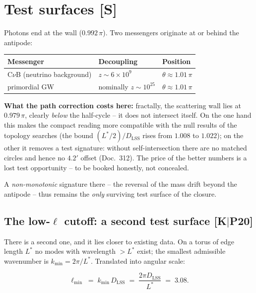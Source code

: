 \chapter{Test surfaces [S]}

Photons end at the wall ($0.992\,\pi$). Two messengers originate
at or behind the antipode:

\begin{center}
\begin{tabular}{lll}
\toprule
Messenger & Decoupling & Position \\
\midrule
C$\nu$B (neutrino background) & $z \sim 6\times10^{9}$ &
  $\theta \approx 1.01\,\pi$ \\
primordial GW & nominally $z \sim 10^{25}$ &
  $\theta \approx 1.01\,\pi$ \\
\bottomrule
\end{tabular}
\end{center}

\textbf{What the path correction costs here:} fractally, the
scattering wall lies at $0.979\,\pi$, clearly \emph{below} the
half-cycle -- it does not intersect itself. On the one hand this
makes the compact reading more compatible with the null results of
the topology searches (the bound $(L^{*}/2)/D_\text{LSS}$ rises
from $1.008$ to $1.022$); on the other it removes a test
signature: without self-intersection there are no matched circles
and hence no $4.2'$ offset (Doc.~312). The price of the better
numbers is a lost test opportunity -- to be booked honestly, not
concealed.

A \emph{non-monotonic} signature there -- the reversal of the mass
drift beyond the antipode -- thus remains the \emph{only}
surviving test surface of the closure.

\section{The low-$\ell$ cutoff: a second test surface [K$|$P20]}

There is a second one, and it lies closer to existing data. On a
torus of edge length $L^{*}$ no modes with wavelength $> L^{*}$
exist; the smallest admissible wavenumber is
$k_\text{min} = 2\pi/L^{*}$. Translated into angular scale:

\begin{equation}
  \ell_\text{min} \;=\; k_\text{min}\,D_\text{LSS}
  \;=\; \frac{2\pi D_\text{LSS}}{L^{*}} \;=\; 3.08 .
\end{equation}

